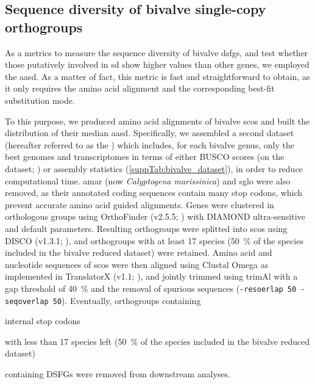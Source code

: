\subsection{Sequence diversity of bivalve single-copy orthogroups}
As a metrics to measure the sequence diversity of bivalve \glspl{dsfg}, and test whether those putatively involved in \gls{sd} show higher values than other genes, we employed the \gls{aasd}. As a matter of fact, this metric is fast and straightforward to obtain, as it only requires the amino acid alignment and the corresponding best-fit substitution mode.

To this purpose, we produced amino acid alignments of bivalve \glspl{sco} and built the distribution of their median \gls{aasd}. Specifically, we assembled a second dataset (hereafter referred to as the ) which includes, for each bivalve genus, only the best genomes and transcriptomes in terms of either BUSCO scores (on the  dataset; ) or assembly statistics (\cref{suppTab:bivalve_dataset}), in order to reduce computational time. \gls{amar} (now \textit{Calyptogena marissinica}) and \gls{sglo} were also removed, as their annotated coding sequences contain many stop codons, which prevent accurate amino acid guided alignments. Genes were clustered in orthologous groups using OrthoFinder (v2.5.5; ) with DIAMOND ultra-sensitive and default parameters. Resulting orthogroups were splitted into \glspl{sco} using DISCO (v1.3.1; ), and orthogroups with at least 17 species (\qty{50}{\percent} of the species included in the bivalve reduced dataset) were retained. Amino acid and nucleotide sequences of \glspl{sco} were then aligned using Clustal Omega as implemented in TranslatorX (v1.1; ), and jointly trimmed using trimAl with a gap threshold of \qty{40}{\percent} and the removal of spurious sequences (\verb|-resoerlap 50 -seqoverlap 50|). Eventually, orthogroups containing
\begin{inlinelist}[itemjoin={{, }}, itemjoin*={{, or }}]
	\item internal stop codons
	\item with less than 17 species left (\qty{50}{\percent} of the species included in the bivalve reduced dataset)
	\item containing DSFGs were removed from downstream analyses.
\end{inlinelist}
